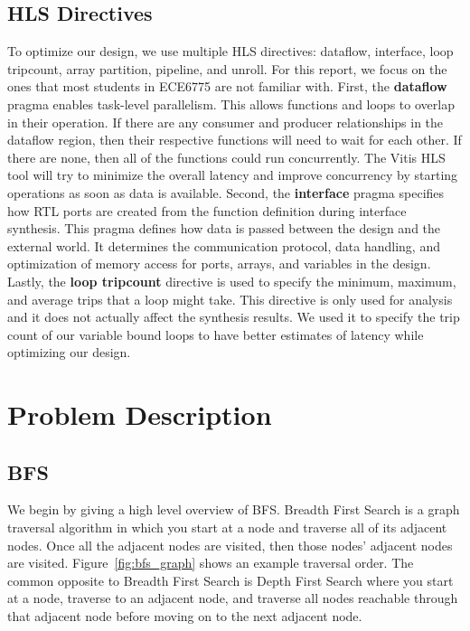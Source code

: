 \documentclass[10pt]{article}
\begin{document}
\subsection{HLS Directives}
\noindent To optimize our design, we use multiple HLS directives: dataflow, interface, loop tripcount,
array partition, pipeline, and unroll. For this report, we focus on the ones that most students 
in ECE6775 are not familiar with. First, the \textbf{dataflow} pragma enables task-level parallelism. 
This allows functions and loops to overlap in their operation. If there are any consumer and producer 
relationships in the dataflow region, then their respective functions will need to wait for each 
other. If there are none, then all of the functions could run concurrently. The Vitis HLS tool 
will try to minimize the overall latency and improve concurrency by starting operations as soon 
as data is available. Second, the \textbf{interface} pragma specifies how RTL ports are created from 
the function definition during interface synthesis. This pragma defines how data is passed between 
the design and the external world. It determines the communication protocol, data handling, and 
optimization of memory access for ports, arrays, and variables in the design. Lastly, the 
\textbf{loop tripcount} directive is used to specify the minimum, maximum, and average trips that a 
loop might take. This directive is only used for analysis and it does not actually affect the synthesis 
results. We used it to specify the trip count of our variable bound loops to have better estimates of 
latency while optimizing our design.

\section{Problem Description}

\subsection{BFS}
\noindent We begin by giving a high level overview of BFS. Breadth First Search is a graph traversal algorithm
in which you start at a node and traverse all of its adjacent nodes. Once all the adjacent nodes are visited,
then those nodes' adjacent nodes are visited. Figure~\ref{fig:bfs_graph} shows an example traversal order. 
The common opposite to Breadth First Search is Depth First Search where you start at a node, traverse to an 
adjacent node, and traverse all nodes reachable through that adjacent node before moving on to the next adjacent
node. \newline
\end{document}
